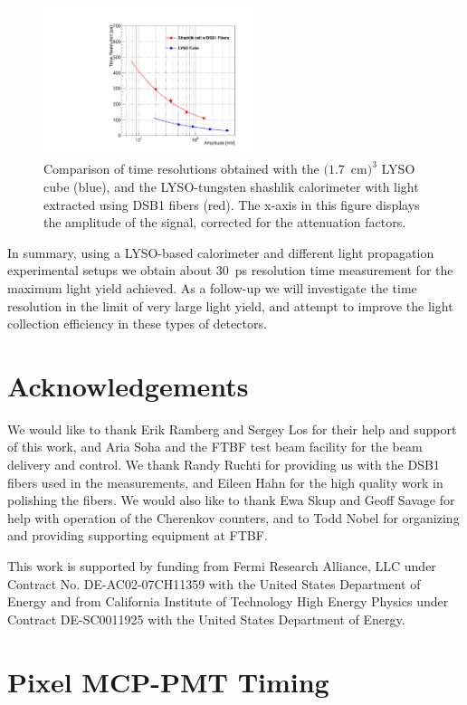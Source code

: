 \begin{figure}[H] \centering
\includegraphics[width=0.55\textwidth]{figs/TimeResolutionVsEnergy_ShashlikDSB1FiberAndCube} 
\caption{\small Comparison of time resolutions obtained with the $(1.7$~cm$)^{3}$ LYSO cube (blue), 
and the LYSO-tungsten shashlik calorimeter with light extracted using DSB1 fibers (red). 
 The x-axis in this figure displays the amplitude of the
signal, corrected for the attenuation factors. }
\label{fig:ShashlikFiberAndCubeTOF}
\end{figure}

In summary, using a LYSO-based calorimeter and different light propagation experimental setups 
we obtain about $30$~ps resolution time measurement for the maximum light yield achieved. 
As a follow-up we will investigate the time resolution in the limit of very large light yield, 
and attempt to improve the light collection efficiency in these types of detectors.

\section{Acknowledgements} We would like to thank Erik Ramberg and Sergey Los for their help and support of this work, and Aria Soha and the FTBF test beam facility for
the beam delivery and control. We thank Randy Ruchti for providing us with
the DSB1 fibers used in the measurements, and Eileen Hahn for the high quality
work in polishing the fibers. We would also like to thank Ewa Skup and Geoff Savage for help with
operation of the Cherenkov counters, and to Todd Nobel for organizing and providing
supporting equipment at FTBF.

This work is supported by funding from Fermi Research Alliance, LLC under Contract No. DE-AC02-07CH11359 with the United States Department of Energy and from California Institute of Technology High Energy Physics under Contract DE-SC0011925 with the United States Department of Energy. 

\clearpage
\section{Pixel MCP-PMT Timing}
